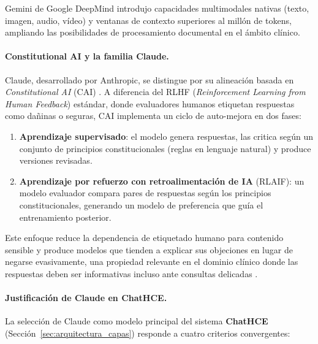 Gemini de Google DeepMind \parencite{geminiteam2023gemini} introdujo capacidades multimodales nativas (texto, imagen, audio, vídeo) y ventanas de contexto superiores al millón de tokens, ampliando las posibilidades de procesamiento documental en el ámbito clínico.

\paragraph{Constitutional AI y la familia Claude.}

Claude, desarrollado por Anthropic, se distingue por su alineación basada en \textit{Constitutional AI} (\ac{CAI}) \parencite{bai2022constitutional}. A diferencia del \ac{RLHF} (\textit{Reinforcement Learning from Human Feedback}) estándar, donde evaluadores humanos etiquetan respuestas como dañinas o seguras, \ac{CAI} implementa un ciclo de auto-mejora en dos fases:

\begin{enumerate}[nosep, leftmargin=*]
  \item \textbf{Aprendizaje supervisado}: el modelo genera respuestas, las critica según un conjunto de principios constitucionales (reglas en lenguaje natural) y produce versiones revisadas.
  \item \textbf{Aprendizaje por refuerzo con retroalimentación de IA} (\ac{RLAIF}): un modelo evaluador compara pares de respuestas según los principios constitucionales, generando un modelo de preferencia que guía el entrenamiento posterior.
\end{enumerate}

Este enfoque reduce la dependencia de etiquetado humano para contenido sensible y produce modelos que tienden a explicar sus objeciones en lugar de negarse evasivamente, una propiedad relevante en el dominio clínico donde las respuestas deben ser informativas incluso ante consultas delicadas \parencite{bai2022constitutional}.

\paragraph{Justificación de Claude en ChatHCE.}

La selección de Claude como modelo principal del sistema \textbf{ChatHCE} (Sección~\ref{sec:arquitectura_capas}) responde a cuatro criterios convergentes:

